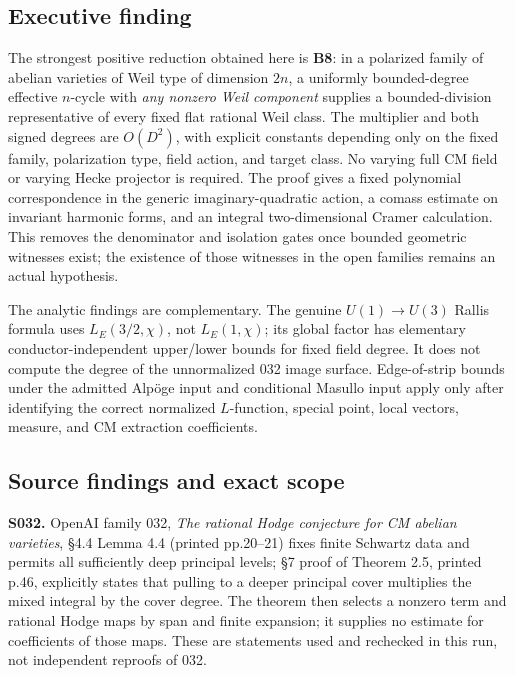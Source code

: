 \documentclass[11pt,a4paper]{article}
\theoremstyle{definition}
\begin{document}
\subsection{Executive finding}\label{executive-finding}

The strongest positive reduction obtained here is \textbf{B8}: in a polarized family of abelian varieties of Weil type of dimension \(2n\), a uniformly bounded-degree effective \(n\)-cycle with \emph{any nonzero Weil component} supplies a bounded-division representative of every fixed flat rational Weil class. The multiplier and both signed degrees are \(O(D^2)\), with explicit constants depending only on the fixed family, polarization type, field action, and target class. No varying full CM field or varying Hecke projector is required. The proof gives a fixed polynomial correspondence in the generic imaginary-quadratic action, a comass estimate on invariant harmonic forms, and an integral two-dimensional Cramer calculation. This removes the denominator and isolation gates once bounded geometric witnesses exist; the existence of those witnesses in the open families remains an actual hypothesis.

The analytic findings are complementary. The genuine \(U(1)\to U(3)\) Rallis formula uses \(L_E(3/2,\chi)\), not \(L_E(1,\chi)\); its global factor has elementary conductor-independent upper/lower bounds for fixed field degree. It does not compute the degree of the unnormalized 032 image surface. Edge-of-strip bounds under the admitted Alpöge input and conditional Masullo input apply only after identifying the correct normalized \(L\)-function, special point, local vectors, measure, and CM extraction coefficients.

\subsection{Source findings and exact scope}\label{source-findings-and-exact-scope}

\textbf{S032.} OpenAI family 032, \emph{The rational Hodge conjecture for CM abelian varieties}, §4.4 Lemma 4.4 (printed pp.20--21) fixes finite Schwartz data and permits all sufficiently deep principal levels; §7 proof of Theorem 2.5, printed p.46, explicitly states that pulling to a deeper principal cover multiplies the mixed integral by the cover degree. The theorem then selects a nonzero term and rational Hodge maps by span and finite expansion; it supplies no estimate for coefficients of those maps. These are statements used and rechecked in this run, not independent reproofs of 032.
\end{document}
